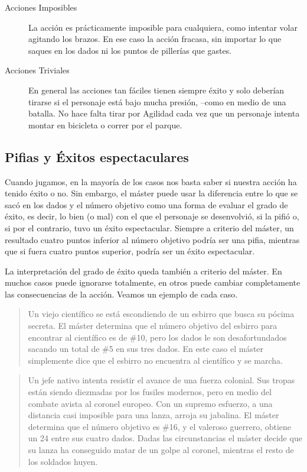 \begin{description}
\item[Acciones Imposibles] La acción es prácticamente imposible para cualquiera, como intentar volar agitando los brazos. En ese caso la acción fracasa, sin importar lo que saques en los dados ni los puntos de pillerías que gastes.
\item[Acciones Triviales] En general las acciones tan fáciles tienen siempre éxito y solo deberían tirarse si el personaje está bajo mucha presión, --como en medio de una batalla. No hace falta tirar por Agilidad cada vez que un personaje intenta montar en bicicleta o correr por el parque.
\end{description}

\subsection{Pifias y Éxitos espectaculares}

Cuando jugamos, en la mayoría de los casos nos basta saber si nuestra acción ha tenido éxito o no. Sin embargo, el máster puede usar la diferencia entre lo que se sacó en los dados y el número objetivo como una forma de evaluar el grado de éxito, es decir, lo bien (o mal) con el que el personaje se desenvolvió, si la pifió o, si por el contrario, tuvo un éxito espectacular. Siempre a criterio del máster, un resultado cuatro puntos inferior al número objetivo podría ser una pifia, mientras que si fuera cuatro puntos superior, podría ser un éxito espectacular.

La interpretación del grado de éxito queda también a criterio del máster. En muchos casos puede ignorarse totalmente, en otros puede cambiar completamente las consecuencias de la acción. Veamos un ejemplo de cada caso.

\begin{quotation}
Un viejo científico se está escondiendo de un esbirro que busca su pócima secreta. El máster determina que el número objetivo del esbirro para encontrar al científico es de \#10, pero los dados le son desafortundados sacando un total de \#5 en sus tres dados. En este caso el máster simplemente dice que el esbirro no encuentra al científico y se marcha.
\end{quotation}
\begin{quotation}
Un jefe nativo intenta resistir el avance de una fuerza colonial. Sus tropas están siendo diezmadas por los fusiles modernos, pero en medio del combate avista al coronel europeo. Con un supremo esfuerzo, a una distancia casi imposible para una lanza, arroja su jabalina. El máster determina que el número objetivo es \#16, y el valeroso guerrero, obtiene un 24 entre sus cuatro dados. Dadas las circunstancias el máster decide que su lanza ha conseguido matar de un golpe al coronel, mientras el resto de los soldados huyen.
\end{quotation}

